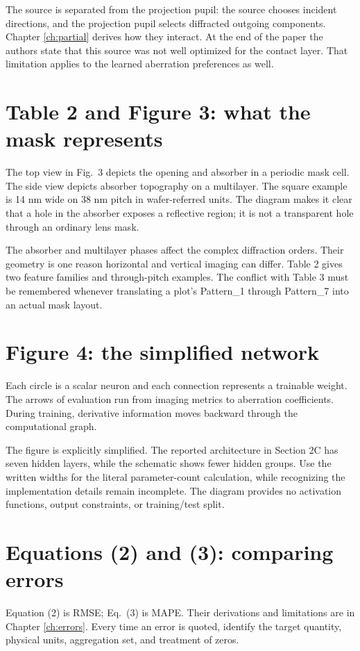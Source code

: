 The source is separated from the projection pupil: the source chooses
incident directions, and the projection pupil selects diffracted outgoing
components. Chapter \ref{ch:partial} derives how they interact.
At the end of the paper the authors state that this source was not well
optimized for the contact layer. That limitation applies to the learned
aberration preferences as well.

\section{Table 2 and Figure 3: what the mask represents}
The top view in Fig.~3 depicts the opening and absorber in a periodic
mask cell. The side view depicts absorber topography on a multilayer.
The square example is 14 nm wide on 38 nm pitch in wafer-referred units.
The diagram makes it clear that a hole in the absorber exposes a
reflective region; it is not a transparent hole through an ordinary lens mask.

The absorber and multilayer phases affect the complex diffraction orders.
Their geometry is one reason horizontal and vertical imaging can differ.
Table 2 gives two feature families and through-pitch examples.
The conflict with Table 3 must be remembered whenever translating
a plot's Pattern\_1 through Pattern\_7 into an actual mask layout.

\section{Figure 4: the simplified network}
Each circle is a scalar neuron and each connection represents a trainable
weight. The arrows of evaluation run from imaging metrics to aberration
coefficients. During training, derivative information moves backward
through the computational graph.

The figure is explicitly simplified. The reported architecture in
Section 2C has seven hidden layers, while the schematic shows fewer
hidden groups. Use the written widths for the literal parameter-count
calculation, while recognizing the implementation details remain incomplete.
The diagram provides no activation functions, output constraints, or
training/test split.

\section{Equations (2) and (3): comparing errors}
Equation (2) is RMSE; Eq.~(3) is MAPE. Their derivations and
limitations are in Chapter \ref{ch:errors}.
Every time an error is quoted, identify the target quantity, physical
units, aggregation set, and treatment of zeros.

